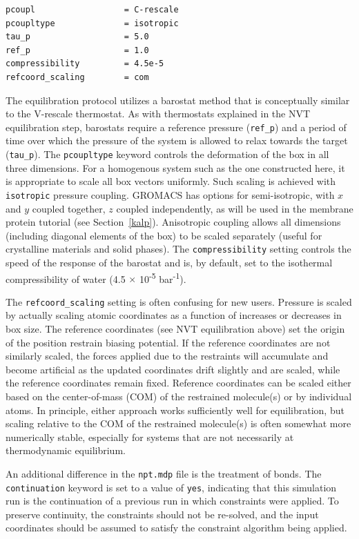 \documentclass[9pt,tutorial,pubversion]{livecoms}
\begin{document}
\begin{lstlisting}
pcoupl                  = C-rescale
pcoupltype              = isotropic
tau_p                   = 5.0
ref_p                   = 1.0
compressibility         = 4.5e-5
refcoord_scaling        = com
\end{lstlisting}

The equilibration protocol utilizes a barostat method that is conceptually similar to the V-rescale thermostat. As with thermostats explained in the NVT equilibration step, barostats require a reference pressure (\texttt{ref\_p}) and a period of time over which the pressure of the system is allowed to relax towards the target (\texttt{tau\_p}). The \texttt{pcoupltype} keyword controls the deformation of the box in all three dimensions. For a homogenous system such as the one constructed here, it is appropriate to scale all box vectors uniformly. Such scaling is achieved with \texttt{isotropic} pressure coupling. GROMACS has options for semi-isotropic, with $x$ and $y$ coupled together, $z$ coupled independently, as will be used in the membrane protein tutorial (see Section~\ref{kalp}). Anisotropic coupling allows all dimensions (including diagonal elements of the box) to be scaled separately (useful for crystalline materials and solid phases). The \texttt{compressibility} setting controls the speed of the response of the barostat and is, by default, set to the isothermal compressibility of water (4.5 $\times$ 10\textsuperscript{-5} bar\textsuperscript{-1}). 

The \texttt{refcoord\_scaling} setting is often confusing for new users. Pressure is scaled by actually scaling atomic coordinates as a function of increases or decreases in box size. The reference coordinates (see NVT equilibration above) set the origin of the position restrain biasing potential. If the reference coordinates are not similarly scaled, the forces applied due to the restraints will accumulate and become artificial as the updated coordinates drift slightly and are scaled, while the reference coordinates remain fixed. Reference coordinates can be scaled either based on the center-of-mass (COM) of the restrained molecule(s) or by individual atoms. In principle, either approach works sufficiently well for equilibration, but scaling relative to the COM of the restrained molecule(s) is often somewhat more numerically stable, especially for systems that are not necessarily at thermodynamic equilibrium.

An additional difference in the \texttt{npt.mdp} file is the treatment of bonds. The \texttt{continuation} keyword is set to a value of \texttt{yes}, indicating that this simulation run is the continuation of a previous run in which constraints were applied. To preserve continuity, the constraints should not be re-solved, and the input coordinates should be assumed to satisfy the constraint algorithm being applied.
\end{document}
